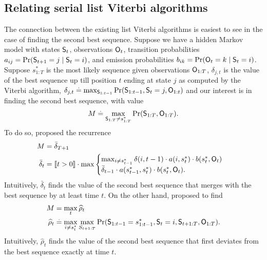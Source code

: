 %
\subsection{Relating serial list Viterbi algorithms}

The connection between the existing list Viterbi algorithms is easiest to see in the case of finding the second best sequence.
Suppose we have a hidden Markov model with states $\mathsf{S}_{t}$, observations $\mathsf{O}_{t}$, transition probabilities $a_{ij} = \Pr( \mathsf{S}_{t+1} = j \mid \mathsf{S}_t = i )$, and emission probabilities $b_{ik} = \Pr( \mathsf{O}_{t} = k \mid \mathsf{S}_t = i )$.
Suppose $s^*_{1:T}$ is the most likely sequence given observations $\mathsf{O}_{1:T}$,
$\delta_{j, t}$ is the value of the best sequence up till position $t$ ending at state $j$ as computed by the Viterbi algorithm,
$\delta_{j, t} \stackrel{.}{=} \max_{\mathsf{S}_{1:t - 1}} \Pr( \mathsf{S}_{1:t - 1}, \mathsf{S}_t = j, \mathsf{O}_{1:t} )$
and our interest is in finding the second best sequence, with value
$$ M \stackrel{.}{=} \max_{\mathsf{S}_{1:T} \neq s^*_{1 : T}}{\Pr( \mathsf{S}_{1:T}, \mathsf{O}_{1:T} )}. $$
To do so, \citet{seshadri1994list} proposed the recurrence
\begin{equation}
    \label{eqn:att-recurrence}
    \begin{aligned}
        M &= \bar{\delta}_{T+1} \\
        \bar{\delta}_t &= 
        \indicator{t > 0} \cdot
        \max
        \begin{cases}
        \max_{i \neq s^*_{t-1}} \delta(i, t-1) \cdot a( i, s^*_{t} ) \cdot b( s^*_{t}, \OSf_{t} ) \\
        \bar{\delta}_{t - 1} \cdot a( s^*_{t - 1}, s^*_{t} ) \cdot b( s^*_{t}, \OSf_{t} ).
        \end{cases}%
    \end{aligned}    
\end{equation}
Intuitively, $\bar{\delta}_t$ finds the value of the second best sequence that merges with the best sequence by at least time $t$.
On the other hand, \citet{nilsson2001sequentially} proposed to find
\begin{align*}
	M &= \max_t \widehat{\rho}_t \\
	\widehat{\rho}_{t} &\stackrel{.}{=} \max_{i \neq s^*_{t}} \max_{S_{t+1:T}} {\Pr( \mathsf{S}_{1:t-1} = s^*_{1:t-1}, \mathsf{S}_t = i, \mathsf{S}_{t+1:T}, \mathsf{O}_{1:T} )}.
\end{align*}
Intuitively, $\widehat{\rho}_t$ finds the value of the second best sequence that first deviates from the best sequence exactly at time $t$.

